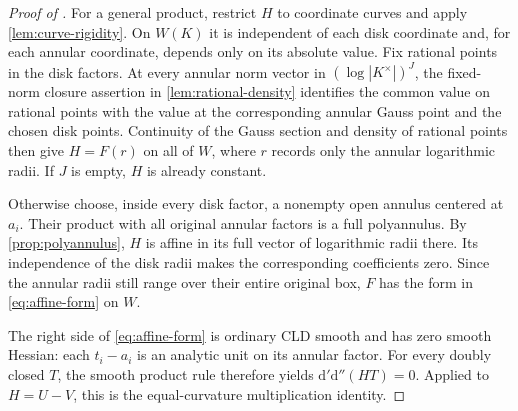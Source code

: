 \documentclass[11pt,a4paper]{amsart}
\begin{document}
\begin{proof}[Proof of ]
For a general product, restrict $H$ to coordinate curves and apply \cref{lem:curve-rigidity}. On $W(K)$ it is independent of each disk coordinate and, for each annular coordinate, depends only on its absolute value. Fix rational points in the disk factors. At every annular norm vector in $(\log|K^\times|)^J$, the fixed-norm closure assertion in \cref{lem:rational-density} identifies the common value on rational points with the value at the corresponding annular Gauss point and the chosen disk points. Continuity of the Gauss section and density of rational points then give $H=F(r)$ on all of $W$, where $r$ records only the annular logarithmic radii. If $J$ is empty, $H$ is already constant.

Otherwise choose, inside every disk factor, a nonempty open annulus centered at $a_i$. Their product with all original annular factors is a full polyannulus. By \cref{prop:polyannulus}, $H$ is affine in its full vector of logarithmic radii there. Its independence of the disk radii makes the corresponding coefficients zero. Since the annular radii still range over their entire original box, $F$ has the form in \eqref{eq:affine-form} on $W$.

The right side of \eqref{eq:affine-form} is ordinary CLD smooth and has zero smooth Hessian: each $t_i-a_i$ is an analytic unit on its annular factor. For every doubly closed $T$, the smooth product rule therefore yields $\mathrm d'\mathrm d''(HT)=0$. Applied to $H=U-V$, this is the equal-curvature multiplication identity.
\end{proof}

\printbibliography
\end{document}
